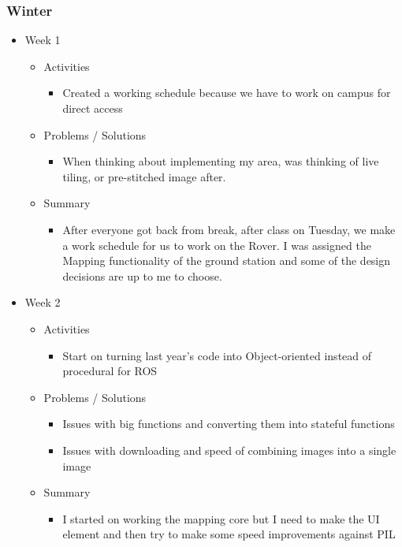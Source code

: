 \subsubsection{Winter}
\begin{itemize}
\item{Week 1}
\begin{itemize}
\item Activities
\begin{itemize}
\item Created a working schedule because we have to work on campus for direct access
\end{itemize}
\item Problems / Solutions
\begin{itemize}
\item When thinking about implementing my area, was thinking of live tiling, or pre-stitched image after.
\end{itemize}
\item Summary
\begin{itemize}
\item After everyone got back from break, after class on Tuesday, we make a work schedule for us to work on the Rover. I was assigned the Mapping functionality of the ground station and some of the design decisions are up to me to choose.
\end{itemize}
\end{itemize}
\item{Week 2}
\begin{itemize}
\item Activities
\begin{itemize}
\item Start on turning last year's code into Object-oriented instead of procedural for ROS 
\end{itemize}
\item Problems / Solutions
\begin{itemize}
\item Issues with big functions and converting them into stateful functions
\item Issues with downloading and speed of combining images into a single image
\end{itemize}
\item Summary
\begin{itemize}
\item I started on working the mapping core but I need to make the UI element and then try to make some speed improvements against PIL
\end{itemize}

\end{itemize}
\end{itemize}
